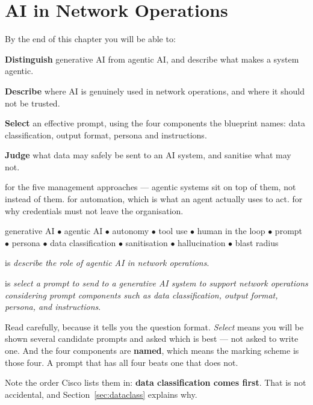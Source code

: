 \chapter{AI in Network Operations}\label{ch:ai}

\begin{outcomes}
By the end of this chapter you will be able to:
\begin{tight}
  \item \textbf{Distinguish} generative AI from agentic AI, and describe what
        makes a system agentic.
  \item \textbf{Describe} where AI is genuinely used in network operations, and
        where it should not be trusted.
  \item \textbf{Select} an effective prompt, using the four components the
        blueprint names: data classification, output format, persona and
        instructions.
  \item \textbf{Judge} what data may safely be sent to an AI system, and sanitise
        what may not.
\end{tight}
\end{outcomes}

\begin{prereq}
 for the five management approaches --- agentic systems sit on
top of them, not instead of them.  for automation, which is what an
agent actually uses to act.  for why credentials must not leave the
organisation.
\end{prereq}

\begin{keyterms}
generative AI $\bullet$ agentic AI $\bullet$ autonomy $\bullet$ tool use
$\bullet$ human in the loop $\bullet$ prompt $\bullet$ persona $\bullet$ data
classification $\bullet$ sanitisation $\bullet$ hallucination $\bullet$ blast
radius
\end{keyterms}

\begin{examnote}
 is \emph{describe the role of agentic AI in network operations}.

 is \emph{select a prompt to send to a generative AI system to support
network operations considering prompt components such as data classification,
output format, persona, and instructions}.

Read  carefully, because it tells you the question format. \emph{Select}
means you will be shown several candidate prompts and asked which is best ---
not asked to write one. And the four components are \textbf{named}, which means
the marking scheme is those four. A prompt that has all four beats one that
does not.

Note the order Cisco lists them in: \textbf{data classification comes first}.
That is not accidental, and Section~\ref{sec:dataclass} explains why.
\end{examnote}

